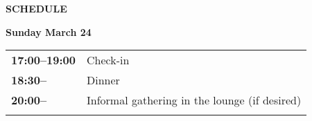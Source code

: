 \documentclass[11pt]{article}
\newcommand{\scheduletablewidth}{5.06in}
\begin{document}
\medskip

\begin{center}
{\bf SCHEDULE }
\end{center}

\noindent\begin{minipage}{\textwidth}
\begin{center} {\bf\large Sunday March 24} \end{center}
\begin{tabular}{ p{0.9in} p{\scheduletablewidth} }
{\bf 17:00--19:00}
  & Check-in
\\
{\bf 18:30--} & Dinner\\
  {\bf 20:00--} & Informal gathering 
in the lounge
(if desired)
  \\
  \\
\end{tabular}
\end{minipage}
\end{document}
